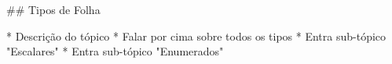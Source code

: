 ## Tipos de Folha

* Descrição do tópico
* Falar por cima sobre todos os tipos
* Entra sub-tópico "Escalares"
* Entra sub-tópico "Enumerados"
